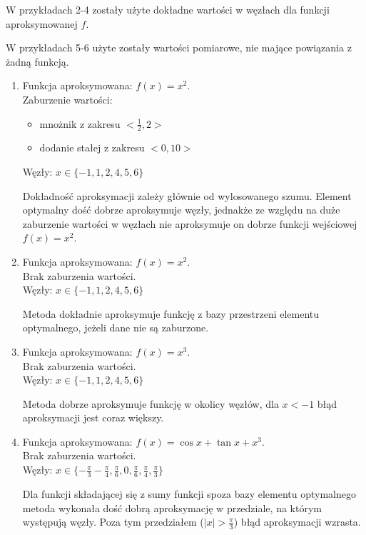\documentclass[12pt]{article}
\begin{document}
	W przykładach 2-4 zostały użyte dokładne wartości w węzłach dla funkcji aproksymowanej $f$.
	
	W przykładach 5-6 użyte zostały wartości pomiarowe, nie mające powiązania z żadną funkcją.
	
	
	\begin{enumerate}[label=\textbf{Przykład \arabic*}]
		\item
		Funkcja aproksymowana: $f(x) = x^2$.\\
		Zaburzenie wartości:
		\begin{itemize}
			\item mnożnik z zakresu $<\frac{1}{2}, 2>$
			\item dodanie stałej z zakresu $<0, 10>$
		\end{itemize}
		Węzły: $x \in \{-1, 1, 2, 4, 5, 6\}$

	
		Dokładność aproksymacji zależy głównie od wylosowanego szumu. Element optymalny dość dobrze aproksymuje węzły, jednakże ze względu na duże zaburzenie wartości w węzłach nie aproksymuje on dobrze funkcji wejściowej $f(x) = x^2$.
		
		\item
		Funkcja aproksymowana: $f(x) = x^2$.\\
		Brak zaburzenia wartości.\\
		Węzły: $x \in \{-1, 1, 2, 4, 5, 6\}$
		
		Metoda dokładnie aproksymuje funkcję z bazy przestrzeni elementu optymalnego, jeżeli dane nie są zaburzone.
		
		\item
		Funkcja aproksymowana: $f(x) = x^3$.\\
		Brak zaburzenia wartości.\\
		Węzły: $x \in \{-1, 1, 2, 4, 5, 6\}$
		
		Metoda dobrze aproksymuje funkcję w okolicy węzłów, dla $x < -1$ błąd aproksymacji jest coraz większy.
		
		\item
		Funkcja aproksymowana: $f(x) = \cos x + \tan x + x^3$.\\
		Brak zaburzenia wartości.\\
		Węzły: $x \in \{-\frac{\pi}{3} -\frac{\pi}{4}, \frac{\pi}{6}, 0, \frac{\pi}{6}, \frac{\pi}{4}, \frac{\pi}{3} \}$
		
		Dla funkcji składającej się z sumy funkcji spoza bazy elementu optymalnego metoda wykonała dość dobrą aproksymację w przedziale, na którym występują węzły. Poza tym przedziałem ($|x| > \frac{\pi}{3}$) błąd aproksymacji wzrasta.
		

\end{enumerate}
\end{document}
